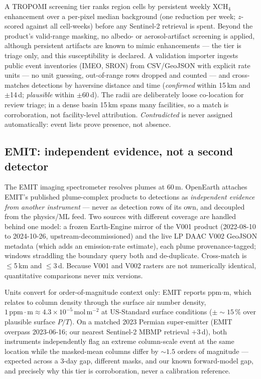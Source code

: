 \documentclass[11pt]{article}
\newcommand{\molm}{\ensuremath{\,\mathrm{mol\,m^{-2}}}}
\begin{document}
A TROPOMI screening tier ranks region cells by persistent weekly XCH$_4$
enhancement over a per-pixel median background (one reduction per week;
$z$-scored against all cell-weeks) before any Sentinel-2 retrieval is
spent. Beyond the product's valid-range masking, no albedo- or
aerosol-artifact screening is applied, although persistent artifacts are
known to mimic enhancements \citep{lorente2021,schuit2023} --- the tier
is triage only, and this susceptibility is declared. A validation
importer ingests public event inventories (IMEO, SRON) from CSV/GeoJSON
with explicit rate units --- no unit guessing, out-of-range rows dropped
and counted --- and cross-matches detections by haversine distance and
time (\emph{confirmed} within 15\,km and $\pm$14\,d; \emph{plausible}
within $\pm$60\,d). The radii are deliberately loose co-location for
review triage; in a dense basin 15\,km spans many facilities, so a match
is corroboration, not facility-level attribution. \emph{Contradicted} is
never assigned automatically: event lists prove presence, not absence.

\subsection{EMIT: independent evidence, not a second
detector}\label{sec:emit}

The EMIT imaging spectrometer \citep{green2020,thorpe2023} resolves plumes
at 60\,m. OpenEarth attaches EMIT's published plume-complex products to
detections as \emph{independent evidence from another instrument} ---
never as detection rows of its own, and decoupled from the physics/ML
feed. Two sources with different coverage are handled behind one model: a
frozen Earth-Engine mirror of the V001 product (2022-08-10 to 2024-10-26,
upstream-decommissioned) and the live LP DAAC V002 GeoJSON metadata (which
adds an emission-rate estimate), each plume provenance-tagged; windows
straddling the boundary query both and de-duplicate. Cross-match is
$\le$5\,km and $\le$3\,d. Because V001 and V002 rasters are not
numerically identical, quantitative comparisons never mix versions.

Units convert for order-of-magnitude context only: EMIT reports
ppm$\cdot$m, which relates to column density through the surface air
number density, $1\,\mathrm{ppm{\cdot}m} \approx 4.3\times10^{-5}\molm$ at
US-Standard surface conditions ($\pm{\sim}15\,\%$ over plausible surface
$P/T$). On a matched 2023 Permian super-emitter (EMIT overpass 2023-06-16;
our nearest Sentinel-2 MBMP retrieval $+3$\,d), both instruments
independently flag an extreme column-scale event at the same location
while the masked-mean columns differ by ${\sim}1.5$ orders of magnitude
--- expected across a 3-day gap, different masks, and our known
forward-model gap, and precisely why this tier is corroboration, never a
calibration reference.
\end{document}
